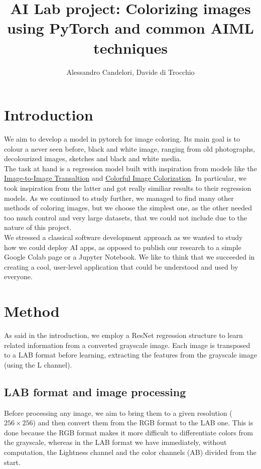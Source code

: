 \documentclass{article}
\title{AI Lab project: Colorizing images using PyTorch and common AIML techniques  }
\author{Alessandro Candelori, Davide di Trocchio}
\begin{document}
\maketitle
\newpage
\tableofcontents
\newpage


\section{Introduction}
We aim to develop a model in pytorch for image coloring. Its main goal is to colour a never seen 
before, black and white image, ranging from old photographs, decolourized images, sketches and 
black and white media. 
\\ 
The task at hand is a regression model built with inspiration from models like the 
\href{https://arxiv.org/pdf/1611.07004.pdf}{Image-to-Image Transaltion}
and 
\href{https://arxiv.org/pdf/1603.08511.pdf}{Colorful Image Colorization}. 
In particular, we took inspiration from the latter and got really similiar results to their regression
models. 
As we continued to study further, we managed to find many other methods of coloring images, but 
we choose the simplest one, as the other needed too much control and very large datasets, that 
we could not include due to the nature of this project. 
\\
We stressed a classical software development approach as we wanted to study how we could deploy 
AI apps, as opposed to publish our research to a simple Google Colab page or a Jupyter Notebook. 
We like to think that we succeeded in creating a cool, user-level application that could be 
understood and used by everyone. 

\section{Method}
As said in the introduction, we employ a ResNet regression structure to learn related information
from a converted grayscale image. Each image is transposed to a LAB format before learning, extracting 
the features from the grayscale image (using the L channel).

\subsection{LAB format and image processing}
Before processing any image, we aim to bring them to a given resolution ($256 \times 256$) and then 
convert them from the RGB format to the LAB one. This is done because the RGB format makes it more 
difficult to differentiate colors from the grayscale, whereas in the LAB format we have 
immediately, without computation, the Lightness channel and the color channels (AB) divided from the 
start. 
\pagebreak
\end{document}
